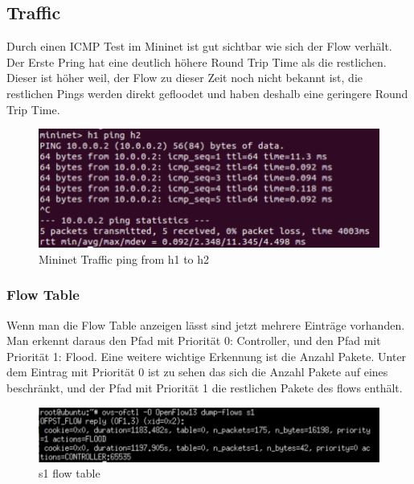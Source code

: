 \documentclass[a4,12pt]{scrartcl}
\begin{document}
\subsection{Traffic}
Durch einen ICMP Test im Mininet ist gut sichtbar wie sich der Flow verhält. Der Erste Pring hat eine deutlich höhere Round Trip Time als die restlichen. Dieser ist höher weil, der Flow zu dieser Zeit noch nicht bekannt ist, die restlichen Pings werden direkt gefloodet und haben deshalb eine geringere Round Trip Time. 
\begin{figure} [H]
	\begin{center}
	\includegraphics[width=1.00\textwidth]{./pictures/ping_test1_flood.png}
	\caption{Mininet Traffic ping from h1 to h2}
	\label{x}
	\end{center}
\end{figure} 

\subsubsection{Flow Table}
Wenn man die Flow Table anzeigen lässt sind jetzt mehrere Einträge vorhanden. Man erkennt daraus den Pfad mit Priorität 0: Controller, und den Pfad mit Priorität 1: Flood. Eine weitere wichtige Erkennung ist die Anzahl Pakete. Unter dem Eintrag mit Priorität 0 ist zu sehen das sich die Anzahl Pakete auf eines beschränkt, und der Pfad mit Priorität 1 die restlichen Pakete des flows enthält. 
\begin{figure} [H]
	\begin{center}
	\includegraphics[width=1.00\textwidth]{./pictures/flow_table_flood.png}
	\caption{s1 flow table}
	\label{x}
	\end{center}
\end{figure} 
\newpage
\end{document}
